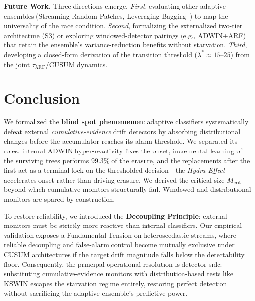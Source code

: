 \documentclass[10pt,conference]{IEEEtran}
\theoremstyle{definition}
\newcommand{\LearnShare}{99.3}               %
\begin{document}
\textbf{Future Work.} Three directions emerge. \emph{First}, evaluating other adaptive ensembles (Streaming Random Patches, Leveraging Bagging~\cite{bifet_leveraging_2010}) to map the universality of the race condition. \emph{Second}, formalizing the externalized two-tier architecture (S3) or exploring windowed-detector pairings (e.g., ADWIN+ARF) that retain the ensemble's variance-reduction benefits without starvation. \emph{Third}, developing a closed-form derivation of the transition threshold ($\lambda^* \approx 15$--$25$) from the joint $\tau_{\mathrm{ARF}}$/CUSUM dynamics.

\section{Conclusion}\label{sec:conclusion}

We formalized the \textbf{blind spot phenomenon}: adaptive classifiers systematically defeat external \emph{cumulative-evidence} drift detectors by absorbing distributional changes before the accumulator reaches its alarm threshold. We separated its roles: internal ADWIN hyper-reactivity fixes the onset, incremental learning of the surviving trees performs $\LearnShare\%$ of the erasure, and the replacements after the first act as a terminal lock on the thresholded decision---the \emph{Hydra Effect} accelerates onset rather than driving erasure. We derived the critical size $M_{\mathrm{crit}}$ beyond which cumulative monitors structurally fail. Windowed and distributional monitors are spared by construction.

To restore reliability, we introduced the \textbf{Decoupling Principle}: external monitors must be strictly more reactive than internal classifiers. Our empirical validation exposes a Fundamental Tension on heteroscedastic streams, where reliable decoupling and false-alarm control become mutually exclusive under CUSUM architectures if the target drift magnitude falls below the detectability floor. Consequently, the principal operational resolution is detector-side: substituting cumulative-evidence monitors with distribution-based tests like KSWIN escapes the starvation regime entirely, restoring perfect detection without sacrificing the adaptive ensemble's predictive power.



\end{document}
